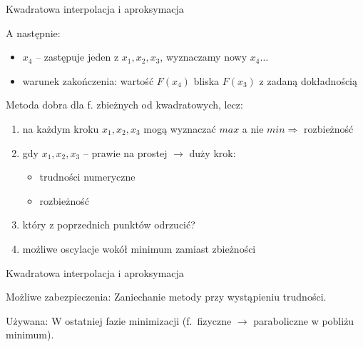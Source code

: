  \begin{frame}{Kwadratowa interpolacja i aproksymacja}
    \begin{block}{A następnie:}
      \begin{itemize}
        \item $x_{4}$ -- zastępuje jeden z $x_{1}{,}x_{2}{,}x_{3}$,
        wyznaczamy nowy $x_{4} \dots$
        \item warunek zakończenia: wartość $F(x_{4})$ bliska
        $F(x_{3})$ z zadaną dokładnością
      \end{itemize}
    \end{block}
    \begin{block}{Metoda dobra dla f. zbieżnych od kwadratowych, lecz:}
      \begin{enumerate}
        \item na każdym kroku $x_{1}{,}x_{2}{,}x_{3}$ mogą
        wyznaczać $max$ a nie $min \Rightarrow$ rozbieżność
        \item gdy $x_{1}{,}x_{2}{,}x_{3}$ -- prawie na prostej
        $\to$ duży krok:
        \begin{itemize}
          \item trudności numeryczne
          \item rozbieżność
        \end{itemize}
        \item który z poprzednich punktów odrzucić?
        \item możliwe oscylacje wokół minimum zamiast zbieżności
      \end{enumerate}
    \end{block}
  \end{frame}

    \begin{frame}{Kwadratowa interpolacja i aproksymacja}
      \begin{block}{Możliwe zabezpieczenia:}
        Zaniechanie metody przy wystąpieniu trudności.
      \end{block}
      \begin{block}{Używana:}
        W ostatniej fazie minimizacji (f.~fizyczne $\to$
        paraboliczne w pobliżu minimum).
      \end{block}
    \end{frame}

